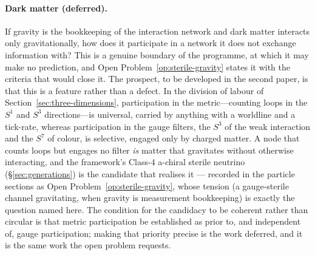 \paragraph{Dark matter (deferred).}
If gravity is the bookkeeping of the interaction network and dark matter interacts only
gravitationally, how does it participate in a network it does not exchange information with?
This is a genuine boundary of the programme, at which it may make no prediction, and Open
Problem~\ref{op:sterile-gravity} states it with the criteria that would close it. The prospect, to be developed in the second paper, is
that this is a feature rather than a defect. In the division of labour of
Section~\ref{sec:three-dimensions}, participation in the metric---counting loops
in the $S^{1}$ and $S^{3}$ directions---is universal, carried by anything with a
worldline and a tick-rate, whereas participation in the gauge filters, the
$S^{3}$ of the weak interaction and the $S^{7}$ of colour, is selective, engaged
only by charged matter. A node that counts loops but engages no filter
\emph{is} matter that gravitates without otherwise interacting, and the
framework's Class-4 a-chiral sterile neutrino (\S\ref{sec:generations}) is the candidate that
realises it --- recorded in the particle sections as Open Problem~\ref{op:sterile-gravity}, whose
tension (a gauge-sterile channel gravitating, when gravity is measurement bookkeeping) is exactly
the question named here. The condition for the candidacy to be coherent rather than circular is
that metric participation be established as prior to, and independent of, gauge participation;
making that priority precise is the work deferred, and it is the same work the open problem
requests.

